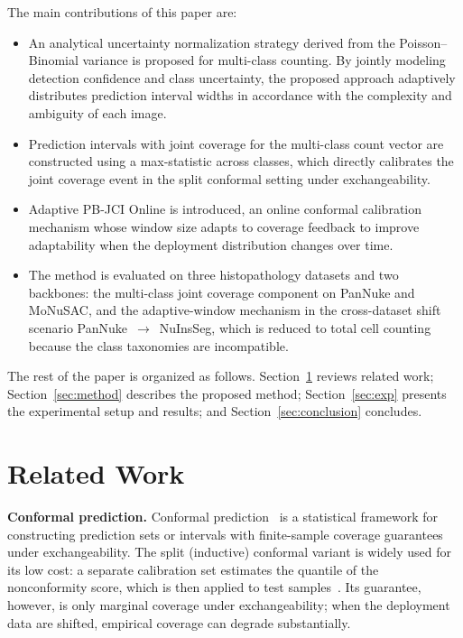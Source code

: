 \documentclass[smallextended,natbib]{svjour3}
\begin{document}
The main contributions of this paper are:
\begin{itemize}
\item An analytical uncertainty normalization strategy derived from the
Poisson--Binomial variance is proposed for multi-class counting. By jointly
modeling detection confidence and class uncertainty, the proposed approach
adaptively distributes prediction interval widths in accordance with the
complexity and ambiguity of each image.

\item Prediction intervals with joint coverage for the multi-class count vector
are constructed using a max-statistic across classes, which directly calibrates
the joint coverage event in the split conformal setting under exchangeability.

\item Adaptive PB-JCI Online is introduced, an online conformal calibration
mechanism whose window size adapts to coverage feedback to improve adaptability
when the deployment distribution changes over time.

\item The method is evaluated on three histopathology datasets and two backbones:
the multi-class joint coverage component on PanNuke and MoNuSAC, and the
adaptive-window mechanism in the cross-dataset shift scenario
PanNuke~\(\to\)~NuInsSeg, which is reduced to total cell counting because the
class taxonomies are incompatible.
\end{itemize}

The rest of the paper is organized as follows. Section~\ref{sec:related} reviews
related work; Section~\ref{sec:method} describes the proposed method;
Section~\ref{sec:exp} presents the experimental setup and results; and
Section~\ref{sec:conclusion} concludes.

\section{Related Work}\label{sec:related}

\textbf{Conformal prediction.}
Conformal prediction~\citep{vovk2005algorithmic} is a statistical framework for
constructing prediction sets or intervals with finite-sample coverage guarantees
under exchangeability. The split (inductive) conformal variant is widely
used for its low cost: a separate calibration set estimates the quantile of the
nonconformity score, which is then applied to test
samples~\citep{angelopoulos2023gentle}. Its guarantee, however, is only marginal
coverage under exchangeability; when the deployment data are shifted, empirical
coverage can degrade substantially.
\end{document}
